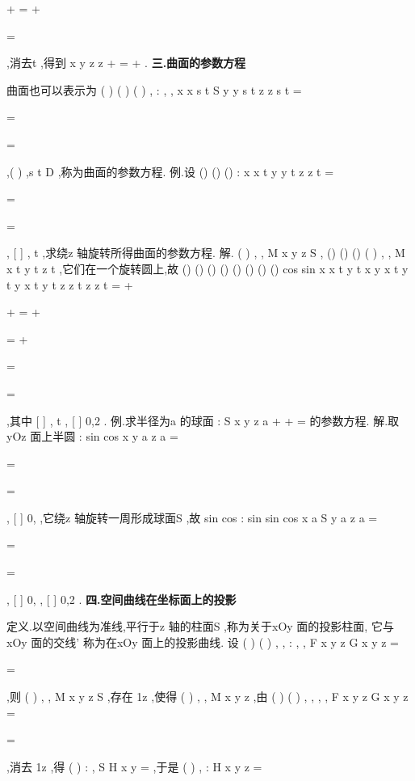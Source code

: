 +
=
+

=

,消去t ,得到
x
y
z
z
+
=
+
. 
\vspace{4pt}
{\bfseries \textcolor{lyred}{三.曲面的参数方程}}

曲面也可以表示为
(
)
(
)
(
)
,
:
,
,
x
x s t
S
y
y s t
z
z s t
=


=


=

,(
)
,s t
D
\in 
,称为曲面的\textcolor{lyred}{参数方程}. 
\textcolor{lyred}{例}.设
()
()
()
:
x
x t
y
y t
z
z t
=


\Gamma 
=


=

,
[
]
,
t
\alpha \beta 
\in 
,求\Gamma 绕z 轴旋转所得曲面的参数方程. 
解.
(
)
, ,
M x y z
S
\forall 
\in 
,
()
()
()
(
)
,
,
M
x t
y t
z t
\exists 
\in \Gamma ,它们在一个旋转圆上,故 
()
()
()
()
()
()
()
()
cos
sin
x
x
t
y
t
x
y
x
t
y
t
y
x
t
y
t
z
z t
z
z t
\theta 
\theta 
=
+


+
=
+


\Rightarrow 
=
+


=


=

,其中
[
]
,
t
\alpha \beta 
\in 
,
[
]
0,2
\theta 
\pi 
\in 
. 
\textcolor{lyred}{例}.求半径为a 的球面
:
S x
y
z
a
+
+
=
的参数方程. 
解.取yOz 面上半圆
:
sin
cos
x
y
a
z
a
\varphi 
\varphi 
=


\Gamma 
=

=

,
[
]
0,
\varphi 
\pi 
\in 
,它绕z 轴旋转一周形成球面S ,故 
sin
cos
:
sin
sin
cos
x
a
S
y
a
z
a
\varphi 
\theta 
\varphi 
\theta 
\varphi 
=


=

=

,
[
]
0,
\varphi 
\pi 
\in 
,
[
]
0,2
\theta 
\pi 
\in 
. 
\vspace{4pt}
{\bfseries \textcolor{lyred}{四.空间曲线在坐标面上的投影}}

\textcolor{lyred}{定义}.以空间曲线\Gamma 为准线,平行于z 轴的柱面S ,称为\Gamma 关于xOy 面的\textcolor{lyred}{投影柱面}, 
它与xOy 面的交线'
\Gamma 称为\Gamma 在xOy 面上的\textcolor{lyred}{投影曲线}. 
设
(
)
(
)
, ,
:
, ,
F x y z
G x y z
=

\Gamma 
=

,则
(
)
, ,
M x y z
S
\forall 
\in 
,存在
1z ,使得
(
)
, ,
M
x y z \in \Gamma ,由 
(
)
(
)
, ,
, ,
F x y z
G x y z
=

=

,消去
1z ,得
(
)
:
,
S H x y =
,于是
(
)
,
:
H x y
z
=

